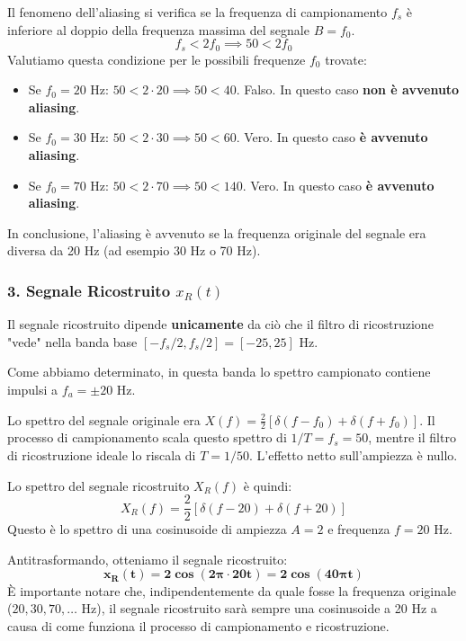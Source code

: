 \begin{soluzione}{17}
    Il fenomeno dell'aliasing si verifica se la frequenza di campionamento $f_s$ è inferiore al doppio della frequenza massima del segnale $B=f_0$.
    \[
        f_s < 2f_0 \implies 50 < 2f_0
    \]
    Valutiamo questa condizione per le possibili frequenze $f_0$ trovate:
    \begin{itemize}
        \item Se $f_0 = 20$ Hz: $50 < 2 \cdot 20 \implies 50 < 40$. Falso. In questo caso \textbf{non è avvenuto aliasing}.
        \item Se $f_0 = 30$ Hz: $50 < 2 \cdot 30 \implies 50 < 60$. Vero. In questo caso \textbf{è avvenuto aliasing}.
        \item Se $f_0 = 70$ Hz: $50 < 2 \cdot 70 \implies 50 < 140$. Vero. In questo caso \textbf{è avvenuto aliasing}.
    \end{itemize}
    In conclusione, l'aliasing è avvenuto se la frequenza originale del segnale era diversa da 20 Hz (ad esempio 30 Hz o 70 Hz).

    \subsubsection*{3. Segnale Ricostruito $x_R(t)$}
    
    Il segnale ricostruito dipende \textbf{unicamente} da ciò che il filtro di ricostruzione "vede" nella banda base $[-f_s/2, f_s/2] = [-25, 25]$ Hz.
    
    Come abbiamo determinato, in questa banda lo spettro campionato contiene impulsi a $f_a = \pm 20$ Hz.
    
    Lo spettro del segnale originale era $X(f) = \frac{2}{2}[\delta(f-f_0) + \delta(f+f_0)]$. Il processo di campionamento scala questo spettro di $1/T = f_s = 50$, mentre il filtro di ricostruzione ideale lo riscala di $T=1/50$. L'effetto netto sull'ampiezza è nullo.
    
    Lo spettro del segnale ricostruito $X_R(f)$ è quindi:
    \[
        X_R(f) = \frac{2}{2} \left[ \delta(f - 20) + \delta(f + 20) \right]
    \]
    Questo è lo spettro di una cosinusoide di ampiezza $A=2$ e frequenza $f=20$ Hz.
    
    Antitrasformando, otteniamo il segnale ricostruito:
    \[
        \mathbf{x_R(t) = 2\cos(2\pi \cdot 20t) = 2\cos(40\pi t)}
    \]
    È importante notare che, indipendentemente da quale fosse la frequenza originale ($20, 30, 70, \dots$ Hz), il segnale ricostruito sarà sempre una cosinusoide a 20 Hz a causa di come funziona il processo di campionamento e ricostruzione.
    
\end{soluzione}